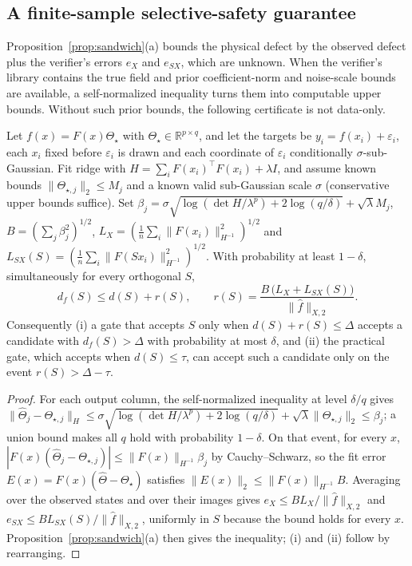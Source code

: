 \subsection{A finite-sample selective-safety guarantee}\label{app:selective}
Proposition~\ref{prop:sandwich}(a) bounds the physical defect by the observed defect plus the verifier's errors $e_X$ and $e_{SX}$, which are unknown. When the verifier's library contains the true field and prior coefficient-norm and noise-scale bounds are available, a self-normalized inequality turns them into computable upper bounds. Without such prior bounds, the following certificate is not data-only.
\begin{theorem}\label{thm:selective}
Let $f(x)=F(x)\Theta_\star$ with $\Theta_\star\in\mathbb R^{p\times q}$, and let the targets be $y_i=f(x_i)+\varepsilon_i$, each $x_i$ fixed before $\varepsilon_i$ is drawn and each coordinate of $\varepsilon_i$ conditionally $\sigma$-sub-Gaussian. Fit ridge with $H=\sum_iF(x_i)^\top F(x_i)+\lambda I$, and assume known bounds $\|\Theta_{\star,j}\|_2\le M_j$ and a known valid sub-Gaussian scale $\sigma$ (conservative upper bounds suffice). Set $\beta_j=\sigma\sqrt{\log(\det H/\lambda^p)+2\log(q/\delta)}+\sqrt\lambda M_j$, $B=(\sum_j\beta_j^2)^{1/2}$, $L_X=(\frac1n\sum_i\|F(x_i)\|^2_{H^{-1}})^{1/2}$ and $L_{SX}(S)=(\frac1n\sum_i\|F(Sx_i)\|^2_{H^{-1}})^{1/2}$. With probability at least $1-\delta$, simultaneously for every orthogonal $S$,
\[
d_f(S)\le d(S)+r(S),\qquad r(S)=\frac{B\,\big(L_X+L_{SX}(S)\big)}{\|\widehat f\|_{X,2}}.
\]
Consequently (i) a gate that accepts $S$ only when $d(S)+r(S)\le\Delta$ accepts a candidate with $d_f(S)>\Delta$ with probability at most $\delta$, and (ii) the practical gate, which accepts when $d(S)\le\tau$, can accept such a candidate only on the event $r(S)>\Delta-\tau$.
\end{theorem}
\begin{proof}
For each output column, the self-normalized inequality \citep{abbasiyadkori2011improved} at level $\delta/q$ gives $\|\widehat\Theta_j-\Theta_{\star,j}\|_H\le\sigma\sqrt{\log(\det H/\lambda^p)+2\log(q/\delta)}+\sqrt\lambda\|\Theta_{\star,j}\|_2\le\beta_j$; a union bound makes all $q$ hold with probability $1-\delta$. On that event, for every $x$, $|F(x)(\widehat\Theta_j-\Theta_{\star,j})|\le\|F(x)\|_{H^{-1}}\beta_j$ by Cauchy--Schwarz, so the fit error $E(x)=F(x)(\widehat\Theta-\Theta_\star)$ satisfies $\|E(x)\|_2\le\|F(x)\|_{H^{-1}}B$. Averaging over the observed states and over their images gives $e_X\le BL_X/\|\widehat f\|_{X,2}$ and $e_{SX}\le BL_{SX}(S)/\|\widehat f\|_{X,2}$, uniformly in $S$ because the bound holds for every $x$. Proposition~\ref{prop:sandwich}(a) then gives the inequality; (i) and (ii) follow by rearranging.
\end{proof}
